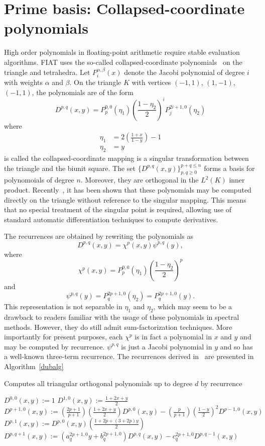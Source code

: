 \section{Prime basis: Collapsed-coordinate polynomials}
High order polynomials in floating-point arithmetic require stable
evaluation algorithms.  FIAT uses the so-called collapsed-coordinate
polynomials~\cite{KarShe99} on the triangle and tetrahedra.  Let
\(P^{\alpha,\beta}_i(x) \) denote the Jacobi polynomial of degree \( i
\) with weights \( \alpha \) and \( \beta \).
On the triangle \( K \) 
with vertices \( (-1,1) \), \((1,-1) \), \( (-1,1) \), the
polynomials are of the form 
\[
  D^{p,q}( x,y ) = P^{0,0}_{p}(\eta_1)  \left( \frac{1-\eta_2}{2}
  \right)^i P^{2i+1,0}_j(\eta_2)
\]
where
\[
\begin{split}
\eta_1 & = 2\left( \frac{1+x}{1-y} \right) - 1\\
\eta_2 & = y
\end{split}
\]
is called the collapsed-coordinate mapping is a singular
transformation between the triangle and the biunit 
square.  The set \( \{ D^{p,q}( x,y) \}_{p,q \geq 0}^{p+q\leq n} \)
forms a basis for polynomoials of degree \( n \).  Moreover, they are
orthogonal in the \( L^2(K) \) inner product.
Recently~\cite{Kir09}, it has been shown that these polynomials
may be computed directly on the triangle without reference to the
singular mapping.  This means that no special treatment of the
singular point is required, allowing use of standard automatic
differentiation techniques to compute derivatives.  

The recurrences are obtained by rewriting the polynomials as
\[
D^{p,q}(x,y) = \chi^{p}(x,y) \psi^{p,q}(y),
\]
where \[
 \chi^{p}(x,y) = P^{0,0}_p(\eta_1) \left( \frac{1-\eta_2}{2}
\right)^p
\]
and
\[
\psi^{p,q}(y) = P^{2p+1,0}_q(\eta_2) = P^{2p+1,0}_q(y).
\]
This representation is not separable in \( \eta_1 \) and \( \eta_2 \),
which may seem to be a drawback to readers familiar with the usage of
these polynomials in spectral methods.  However, they do still admit
sum-factorization techniques.  More importantly for present purposes,
each \( \chi^p \) is in fact a polynomial in \( x \) and \( y \) and
may be computed by recurrence.  \( \psi^{p,q} \) is just a Jacobi
polynomial in \( y \) and so has a well-known three-term recurrence.
The recurrences derived in~\cite{Kir09} are presented in Algorithm~\ref{dubalg}
\begin{algorithm}
\caption{Computes all triangular orthogonal polynomials up to degree
  \( d \) by recurrence}
\label{dubalg}
\begin{algorithmic}[1]
\State $D^{0,0}(x,y) := 1$
\State $D^{1,0}(x,y) := \frac{1+2x+y}{2}$
\State $D^{p+1,0}(x,y) := \left( \frac{2p+1}{p+1} \right)
\left( \frac{1 + 2x + y}{2} \right) D^{p,0}(x,y)
- \left( \frac{p}{p+1} \right) \left( \frac{1-y}{2} \right)^2
D^{p-1,0}(x,y)$
\EndFor
{}
\State $D^{p,1}(x,y) := D^{p,0}(x,y) \left( \frac{1+2p+(3+2p) y}{2} \right)$
\EndFor
{}
\State $D^{p,q+1}(x,y) := 
\left( a_{q}^{2p+1,0} y + b_q^{2p+1,0} \right) D^{p,q}(x,y)
- c_q^{2p+1,0} D^{p,q-1}(x,y)$
\EndFor
\EndFor
\end{algorithmic}
\end{algorithm}


